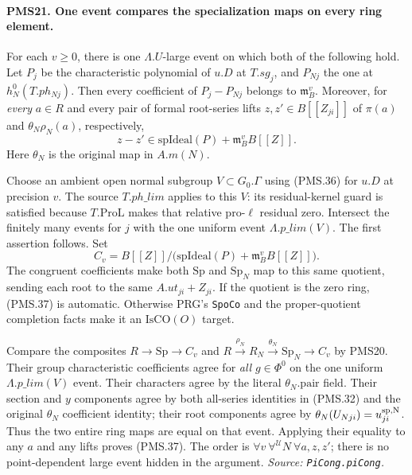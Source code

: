 \paragraph{PMS21. One event compares the specialization maps on every ring element.}
\label{claim:PMS21}
For each $v\geq0$, there is one $\Lambda.U$-large event on
which both of the following hold.  Let $P_j$ be the
characteristic polynomial of $u.D$ at $T.sg_j$, and $P_{Nj}$
the one at $h_N^0(T.ph_{Nj})$.  Then every coefficient of
$P_j-P_{Nj}$ belongs to $\mathfrak m_B^v$.  Moreover, for
\emph{every} $a\in R$ and every pair of formal root-series
lifts $z,z'\in B[[Z_{ji}]]$ of $\pi(a)$ and
$\theta_N\rho_N(a)$, respectively,
\[
 z-z'\in\mathrm{spIdeal}(P)+\mathfrak m_B^vB[[Z]].             \tag{PMS.37}
\]
Here $\theta_N$ is the original map in $A.m(N)$.

Choose an ambient open normal subgroup $V\subset G_0.\Gamma$
using (PMS.36) for $u.D$ at precision $v$.
The source $T.ph\_lim$ applies to this $V$: its residual-kernel
guard is satisfied because $T.\mathrm{ProL}$ makes that
relative pro-$\ell$ residual zero.  Intersect the finitely many
events for $j$ with the one uniform event $\Lambda.p\_lim(V)$.
The first assertion follows.  Set
\[
 C_v=B[[Z]]/
      \bigl(\mathrm{spIdeal}(P)+\mathfrak m_B^vB[[Z]]\bigr).
\]
The congruent coefficients make both $\mathrm{Sp}$ and
$\mathrm{Sp}_N$ map to this same quotient, sending each root
to the same $A.ut_{ji}+Z_{ji}$.  If the quotient is the zero
ring, (PMS.37) is automatic.  Otherwise PRG's \texttt{SpoCo}
and the proper-quotient completion facts make it an
$\mathrm{IsCO}(O)$ target.

Compare the composites $R\to\mathrm{Sp}\to C_v$ and
$R\xrightarrow{\rho_N}R_N\xrightarrow{\theta_N}\mathrm{Sp}_N
\to C_v$ by PMS20.  Their group characteristic coefficients
agree for \emph{all} $g\in\Phi^0$ on the one uniform
$\Lambda.p\_lim(V)$ event.  Their characters agree by the
literal $\theta_N.\mathrm{pair}$ field.  Their section and
$y$ components agree by both all-series identities in
(PMS.32) and the original $\theta_N$ coefficient identity;
their root components agree by $\theta_N(U_{Nj i})=u^{\rm sp,N}_{ji}$.
Thus the two entire ring maps are equal on that event.
Applying their equality to any $a$ and any lifts proves
(PMS.37).  The order is
$\forall v\ \forall^{\mathscr U}N\ \forall a,z,z'$;
there is no point-dependent large event hidden in the argument.
\hfill\textit{Source: \texttt{PiCong.piCong}.}


